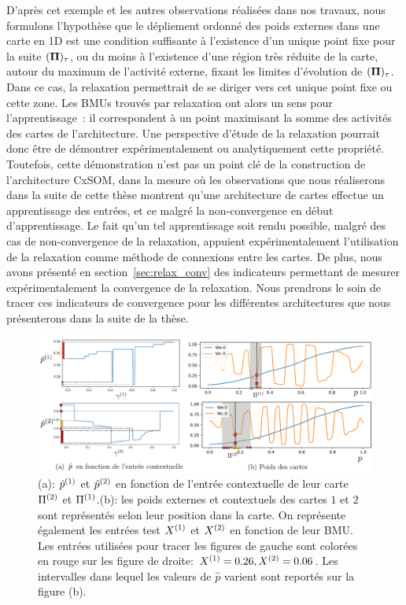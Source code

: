 \documentclass[../main]{subfiles}
\begin{document}
D'après cet exemple et les autres observations réalisées dans nos travaux, nous formulons l'hypothèse que le dépliement ordonné des poids externes dans une carte en 1D est une condition suffisante à l'existence d'un unique point fixe pour la suite $(\mathbf{\Pi})_\tau$, ou du moins à l'existence d'une région très réduite de la carte, autour du maximum de l'activité externe, fixant les limites d'évolution de $(\mathbf{\Pi})_\tau$.
Dans ce cas, la relaxation permettrait de se diriger vers cet unique point fixe ou cette zone.
Les BMUs trouvés par relaxation ont alors un sens pour l'apprentissage~: il correspondent à un point maximisant la somme des activités des cartes de l'architecture.
Une perspective d'étude de la relaxation pourrait donc être de démontrer expérimentalement ou analytiquement cette propriété. 
Toutefois, cette démonstration n'est pas un point clé de la construction de l'architecture CxSOM, dans la mesure où les observations que nous réaliserons dans la suite de cette thèse montrent qu'une architecture de cartes effectue un apprentissage des entrées, et ce malgré la non-convergence en début d'apprentissage. 
Le fait qu'un tel apprentissage soit rendu possible, malgré des cas de non-convergence de la relaxation, appuient expérimentalement l'utilisation de la relaxation comme méthode de connexions entre les cartes. 
De plus, nous avons présenté en section~\ref{sec:relax_conv} des indicateurs permettant de mesurer expérimentalement la convergence de la relaxation. Nous prendrons le soin de tracer ces indicateurs de convergence pour les différentes architectures que nous présenterons dans la suite de la thèse.


\begin{figure}
	\includegraphics[width=\textwidth]{am_w_006_noinp}
	\caption{(a): $\hat{p}^{({1})}$ et $\hat{p}^{({2})}$ en fonction de l'entrée contextuelle de leur carte $\Pi^{({2})}$ et $\Pi^{({1})}$.(b): les poids externes et contextuels des cartes $1$ et $2$ sont représentés selon leur position dans la carte. On représente également les entrées test $X^{({1})}$ et $X^{({2})}$ en fonction de leur BMU. Les entrées utilisées pour tracer les figures de gauche sont colorées en rouge sur les figure de droite: $X^{({1})}=0.26,X^{({2})}=0.06$. Les intervalles dans lequel les valeurs de $\hat{p}$ varient sont reportés sur la figure (b).}
	\label{fig:w006}
	\end{figure}
\end{document}

